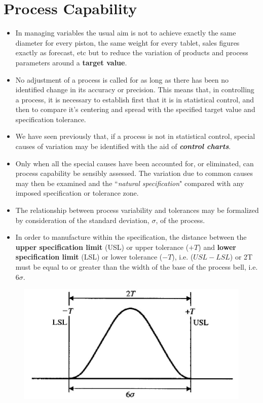 \documentclass[MASTER-SPC.tex]{subfiles}
\begin{document}
\large
\section{Process Capability}
\begin{itemize}
\item In managing variables the usual aim is not to achieve exactly the same diameter for every piston, the same weight for every tablet, sales figures exactly as forecast, etc but to reduce the variation of products and process parameters around a \textbf{target value}. 
	
\item No adjustment of a process is called for as long as there has been no identified change in its accuracy or precision. This means that, in controlling a process, it is necessary to establish first that it is in statistical control, and then to compare it’s centering and spread with the specified target value and specification tolerance.
	
\item We have seen previously that, if a process is not in statistical control, special causes of variation may be identified with the aid of \textbf{\textit{control charts}}. 
	
\item Only when all the special causes have been accounted for, or
	eliminated, can process capability be sensibly assessed. The variation due to common causes may then be examined and the ``\textit{natural specification}" compared with any imposed specification or tolerance zone.
\item The relationship between process variability and tolerances may be formalized by consideration of the standard deviation, $\sigma$, of the process. 
	
	\item In order to manufacture within the specification, the distance between the \textbf{upper specification limit} (USL) or upper tolerance ($+T$) and \textbf{lower specification limit} (LSL) or lower tolerance ($-T$), i.e. ($USL-LSL$) or 2T must be equal to or greater than the width of the base of the process bell, i.e. $6\sigma$.
\end{itemize}

	

	
	\begin{figure}[h!]
		\centering
		\includegraphics[width=0.8\linewidth]{proccapindices/image1}
	\end{figure}
	
\end{document}
